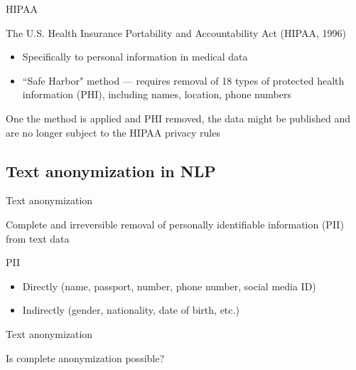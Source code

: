 \documentclass[12pt,aspectratio=169,handout]{beamer}
\begin{document}
\begin{frame}{HIPAA}

The U.S. Health Insurance Portability and Accountability Act (HIPAA, 1996)

\begin{itemize}
\item Specifically to personal information in medical data
\item ``Safe Harbor" method --- requires removal of 18 types of protected health information (PHI), including names, location, phone numbers
\end{itemize}

One the method is applied and PHI removed, the data might be published and are no longer subject to the HIPAA privacy rules


\end{frame}


\subsection{Text anonymization in NLP}

\begin{frame}{Text anonymization}

Complete and irreversible removal of personally identifiable information (PII) from text data

\begin{block}{PII}
\begin{itemize}
\item Directly (name, passport, number, phone number, social media ID)
\item Indirectly (gender, nationality, date of birth, etc.)
\end{itemize}
\end{block}

	
\end{frame}


\begin{frame}{Text anonymization}

Is complete anonymization possible?

	
\end{frame}
\end{document}
